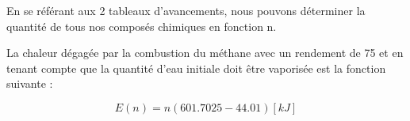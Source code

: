 \documentclass{article}
\begin{document}
En se référant aux 2 tableaux d'avancements, nous pouvons déterminer la quantité de tous nos composés chimiques en fonction n.


La chaleur dégagée par la combustion du méthane avec un rendement de 75 et en tenant compte que la quantité d'eau initiale doit être vaporisée est la fonction suivante : 

$$E(n)= n(601.7025-44.01)[kJ]$$




 
\end{document}
